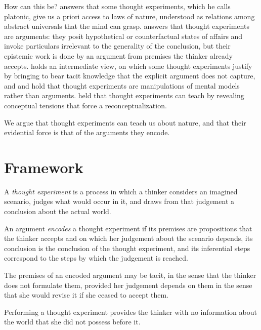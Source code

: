 \documentclass{situationist-preprint}
\begin{document}
How can this be? \citet{Brown1991} answers that some thought experiments, which he calls platonic, give us a priori access to laws of nature, understood as relations among abstract universals that the mind can grasp. \citet{Norton1996} answers that thought experiments are arguments: they posit hypothetical or counterfactual states of affairs and invoke particulars irrelevant to the generality of the conclusion, but their epistemic work is done by an argument from premises the thinker already accepts. \citet{Gendler1998} holds an intermediate view, on which some thought experiments justify by bringing to bear tacit knowledge that the explicit argument does not capture, and \citet{Nersessian1993} and \citet{Miscevic1992} hold that thought experiments are manipulations of mental models rather than arguments. \citet{Kuhn1977} held that thought experiments can teach by revealing conceptual tensions that force a reconceptualization.

We argue that thought experiments can teach us about nature, and that their evidential force is that of the arguments they encode.

\section{Framework}

\begin{definition}\label{d:te}
A \emph{thought experiment} is a process in which a thinker considers an imagined scenario, judges what would occur in it, and draws from that judgement a conclusion about the actual world.
\end{definition}

\begin{definition}\label{d:enc}
An argument \emph{encodes} a thought experiment if its premises are propositions that the thinker accepts and on which her judgement about the scenario depends, its conclusion is the conclusion of the thought experiment, and its inferential steps correspond to the steps by which the judgement is reached.
\end{definition}

The premises of an encoded argument may be tacit, in the sense that the thinker does not formulate them, provided her judgement depends on them in the sense that she would revise it if she ceased to accept them.

\begin{principle}\label{p:noinfo}
Performing a thought experiment provides the thinker with no information about the world that she did not possess before it.
\end{principle}
\end{document}
